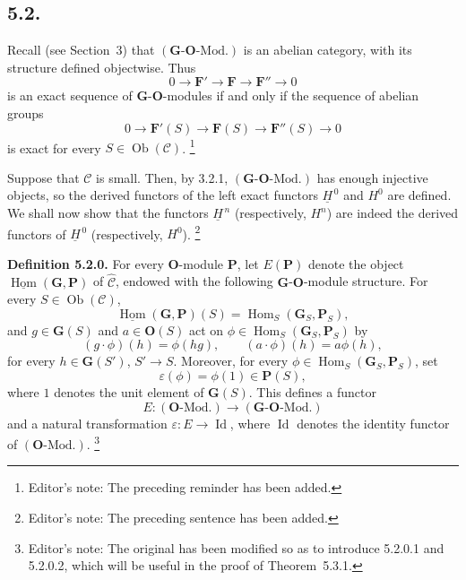 \subsection*{5.2.}

Recall (see Section~3) that
\((\mathbf G\text{-}\mathbf O\text{-Mod.})\) is an abelian category,
with its structure defined objectwise. Thus
\[
  0\longrightarrow\mathbf F'
   \longrightarrow\mathbf F
   \longrightarrow\mathbf F''
   \longrightarrow0
\]
is an exact sequence of \(\mathbf G\)-\(\mathbf O\)-modules if and only if
the sequence of abelian groups
\[
  0\longrightarrow\mathbf F'(S)
   \longrightarrow\mathbf F(S)
   \longrightarrow\mathbf F''(S)
   \longrightarrow0
\]
is exact for every \(S\in\operatorname{Ob}(\mathscr C)\).
\footnote{Editor's note: The preceding reminder has been added.}

Suppose that \(\mathscr C\) is small. Then, by 3.2.1,
\((\mathbf G\text{-}\mathbf O\text{-Mod.})\) has enough injective objects,
so the derived functors of the left exact functors
\(\underline H^{\,0}\) and \(H^0\) are defined. We shall now show that
the functors \(\underline H^{\,n}\) (respectively, \(H^n\)) are indeed the
derived functors of \(\underline H^{\,0}\) (respectively, \(H^0\)).
\footnote{Editor's note: The preceding sentence has been added.}

\medskip
\noindent\textbf{Definition 5.2.0.}
For every \(\mathbf O\)-module \(\mathbf P\), let \(E(\mathbf P)\) denote
the object \(\underline{\operatorname{Hom}}(\mathbf G,\mathbf P)\) of
\(\widehat{\mathscr C}\), endowed with the following
\(\mathbf G\)-\(\mathbf O\)-module structure. For every
\(S\in\operatorname{Ob}(\mathscr C)\),
\[
  \underline{\operatorname{Hom}}(\mathbf G,\mathbf P)(S)
    =\operatorname{Hom}_S(\mathbf G_S,\mathbf P_S),
\]
and \(g\in\mathbf G(S)\) and \(a\in\mathbf O(S)\) act on
\(\phi\in\operatorname{Hom}_S(\mathbf G_S,\mathbf P_S)\) by
\[
  (g\cdot\phi)(h)=\phi(hg),
  \qquad
  (a\cdot\phi)(h)=a\phi(h),
\]
for every \(h\in\mathbf G(S')\), \(S'\to S\). Moreover, for every
\(\phi\in\operatorname{Hom}_S(\mathbf G_S,\mathbf P_S)\), set
\[
  \varepsilon(\phi)=\phi(1)\in\mathbf P(S),
\]
where \(1\) denotes the unit element of \(\mathbf G(S)\).
This defines a functor
\[
  E:(\mathbf O\text{-Mod.})
    \longrightarrow(\mathbf G\text{-}\mathbf O\text{-Mod.})
\]
and a natural transformation \(\varepsilon:E\to\operatorname{Id}\), where
\(\operatorname{Id}\) denotes the identity functor of
\((\mathbf O\text{-Mod.})\).
\footnote{Editor's note: The original has been modified so as to introduce
5.2.0.1 and 5.2.0.2, which will be useful in the proof of Theorem~5.3.1.}

